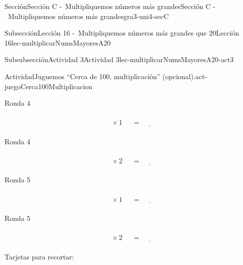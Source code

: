 \begin{sectionptx}{Sección}{Sección C -~Multipliquemos números más grandes}{}{Sección C -~Multipliquemos números más grandes}{}{}{gra3-uni4-secC}
\begin{subsectionptx}{Subsección}{Lección 16 -~Multipliquemos números más grandes que 20}{}{Lección 16}{}{}{lec-multiplicarNumsMayoresA20}
\begin{subsubsectionptx}{Subsubsección}{Actividad 3}{}{Actividad 3}{}{}{lec-multiplicarNumsMayoresA20-act3}
\begin{activity}{Actividad}{Juguemos “Cerca de 100, multiplicación” (opcional).}{act-juegoCerca100Multiplicacion}
\begin{sidebyside}{2}{0}{0}{0.1}%
\begin{sbspanel}{0.45}%
Ronda 4%
\par
%
\begin{equation*}
\boxed{\phantom{\frac{00}{00}}} \times 1 \ \boxed{\phantom{\frac{00}{00}}}= \underline{\hspace{1cm}}
\end{equation*}
%
\end{sbspanel}%
\begin{sbspanel}{0.45}%
Ronda 4%
\par
%
\begin{equation*}
\boxed{\phantom{\frac{00}{00}}} \times 2 \ \boxed{\phantom{\frac{00}{00}}}= \underline{\hspace{1cm}}
\end{equation*}
%
\end{sbspanel}%
\end{sidebyside}%
\begin{sidebyside}{2}{0}{0}{0.1}%
\begin{sbspanel}{0.45}%
Ronda 5%
\par
%
\begin{equation*}
\boxed{\phantom{\frac{00}{00}}} \times 1 \ \boxed{\phantom{\frac{00}{00}}}= \underline{\hspace{1cm}}
\end{equation*}
%
\end{sbspanel}%
\begin{sbspanel}{0.45}%
Ronda 5%
\par
%
\begin{equation*}
\boxed{\phantom{\frac{00}{00}}} \times 2 \ \boxed{\phantom{\frac{00}{00}}}= \underline{\hspace{1cm}}
\end{equation*}
%
\end{sbspanel}%
\end{sidebyside}%
%
\end{activity}%
\begin{cutoutpage}
Tarjetas para recortar:
\begin{image}{0}{1}{0}{}%

\end{image}
\end{cutoutpage}
\end{subsubsectionptx}
\end{subsectionptx}
\end{sectionptx}
